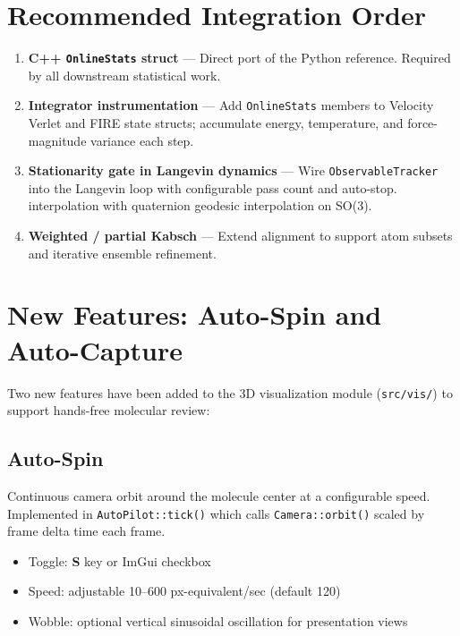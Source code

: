 ﻿\documentclass[11pt]{article}
\begin{document}
\section{Recommended Integration Order}

\begin{enumerate}
\item \textbf{C++ \texttt{OnlineStats} struct} --- Direct port of the Python
	  reference. Required by all downstream statistical work.
\item \textbf{Integrator instrumentation} --- Add \texttt{OnlineStats} members
	  to Velocity Verlet and FIRE state structs; accumulate energy, temperature,
	  and force-magnitude variance each step.
\item \textbf{Stationarity gate in Langevin dynamics} --- Wire
	  \texttt{ObservableTracker} into the Langevin loop with configurable
	  pass count and auto-stop.
	  interpolation with quaternion geodesic interpolation on SO(3).
\item \textbf{Weighted / partial Kabsch} --- Extend alignment to support atom
	  subsets and iterative ensemble refinement.
\end{enumerate}


\section{New Features: Auto-Spin and Auto-Capture}

Two new features have been added to the 3D visualization module
(\texttt{src/vis/}) to support hands-free molecular review:

\subsection{Auto-Spin}

Continuous camera orbit around the molecule center at a configurable speed.
Implemented in \texttt{AutoPilot::tick()} which calls \texttt{Camera::orbit()}
scaled by frame delta time each frame.

\begin{itemize}
\item Toggle: \textbf{S} key or ImGui checkbox
\item Speed: adjustable 10--600 px-equivalent/sec (default 120)
\item Wobble: optional vertical sinusoidal oscillation for presentation views
\end{itemize}
\end{document}

